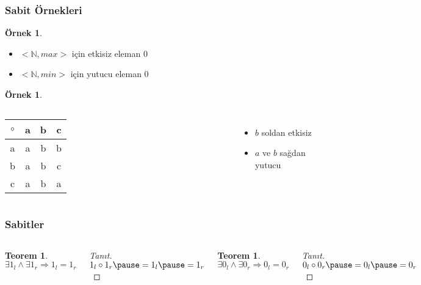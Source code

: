 \documentclass[dvipsnames]{beamer}
\theoremstyle{definition}
\theoremstyle{example}
\newtheorem{ornek}[theorem]{Örnek}
\theoremstyle{plain}
\newtheorem{teorem}[theorem]{Teorem}
\begin{document}
\begin{frame}
  \frametitle{Sabit Örnekleri}

  \begin{ornek}
    \begin{itemize}
      \item $<\mathbb{N}, max>$ için etkisiz eleman $0$
      \item $<\mathbb{N}, min>$ için yutucu eleman $0$
    \end{itemize}
  \end{ornek}

  \pause
  \begin{ornek}
    \begin{columns}
      \begin{tabular}{c||c|c|c}
        $\circ$ & a & b & c\\\hline\hline
              a & a & b & b\\\hline
              b & a & b & c\\\hline
              c & a & b & a
      \end{tabular}

      \begin{itemize}
        \item $b$ soldan etkisiz
        \item $a$ ve $b$ sağdan yutucu
      \end{itemize}
    \end{columns}
  \end{ornek}
\end{frame}

\begin{frame}
  \frametitle{Sabitler}

  \begin{columns}
    \begin{teorem}
      $\exists 1_l \wedge \exists 1_r \Rightarrow 1_l = 1_r$
    \end{teorem}

    \pause
    \begin{proof}[Tanıt]
      $1_l \circ 1_r \pause = 1_l \pause = 1_r$
    \end{proof}

    \pause
    \begin{teorem}
      $\exists 0_l \wedge \exists 0_r \Rightarrow 0_l = 0_r$
    \end{teorem}

    \pause
    \begin{proof}[Tanıt]
      $0_l \circ 0_r \pause = 0_l \pause = 0_r$
    \end{proof}
  \end{columns}
\end{frame}
\end{document}
